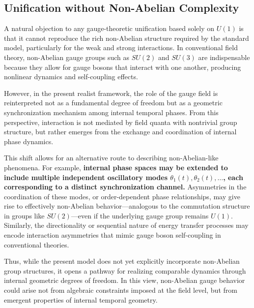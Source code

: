\documentclass[%
 reprint,
 amsmath,amssymb,
 aps,
]{revtex4-1}
\numberwithin{equation}{section}%
\begin{document}
\subsection{Unification without Non-Abelian Complexity}

A natural objection to any gauge-theoretic unification based solely on $U(1)$ is that it cannot reproduce the rich non-Abelian structure required by the standard model, particularly for the weak and strong interactions. In conventional field theory, non-Abelian gauge groups such as $SU(2)$ and $SU(3)$ are indispensable because they allow for gauge bosons that interact with one another, producing nonlinear dynamics and self-coupling effects.

However, in the present realist framework, the role of the gauge field is reinterpreted not as a fundamental degree of freedom but as a geometric synchronization mechanism among internal temporal phases. From this perspective, interaction is not mediated by field quanta with nontrivial group structure, but rather emerges from the exchange and coordination of internal phase dynamics.

This shift allows for an alternative route to describing non-Abelian-like phenomena. For example, \textbf{internal phase spaces may be extended to include multiple independent oscillatory modes $\theta_1(t), \theta_2(t), \dots$, each corresponding to a distinct synchronization channel.} Asymmetries in the coordination of these modes, or order-dependent phase relationships, may give rise to effectively non-Abelian behavior—analogous to the commutation structure in groups like $SU(2)$—even if the underlying gauge group remains $U(1)$. Similarly, the directionality or sequential nature of energy transfer processes may encode interaction asymmetries that mimic gauge boson self-coupling in conventional theories.

Thus, while the present model does not yet explicitly incorporate non-Abelian group structures, it opens a pathway for realizing comparable dynamics through internal geometric degrees of freedom. In this view, non-Abelian gauge behavior could arise not from algebraic constraints imposed at the field level, but from emergent properties of internal temporal geometry.
\end{document}
